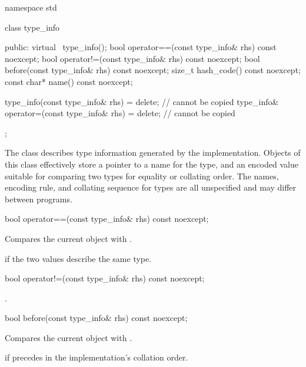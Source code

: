%
\begin{codeblock}
namespace std {
  class type_info {
  public:
    virtual ~type_info();
    bool operator==(const type_info& rhs) const noexcept;
    bool operator!=(const type_info& rhs) const noexcept;
    bool before(const type_info& rhs) const noexcept;
    size_t hash_code() const noexcept;
    const char* name() const noexcept;

    type_info(const type_info& rhs) = delete;            // cannot be copied
    type_info& operator=(const type_info& rhs) = delete; // cannot be copied
  };
}
\end{codeblock}

\pnum
The class
describes type information generated by the implementation.
Objects of this class effectively store a pointer to a name for the type, and
an encoded value suitable for comparing two types for equality or collating order.
The names, encoding rule, and collating sequence for types are all unspecified
%
and may differ between programs.

%
\begin{itemdecl}
bool operator==(const type_info& rhs) const noexcept;
\end{itemdecl}

\begin{itemdescr}
\pnum
\effects
Compares the current object with .

\pnum
\returns
{}
if the two values describe the same type.
\end{itemdescr}

%
\begin{itemdecl}
bool operator!=(const type_info& rhs) const noexcept;
\end{itemdecl}

\begin{itemdescr}
\pnum
\returns
{}.
\end{itemdescr}

%
\begin{itemdecl}
bool before(const type_info& rhs) const noexcept;
\end{itemdecl}

\begin{itemdescr}
\pnum
\effects
Compares the current object with .

\pnum
\returns
{}
if
precedes  in the implementation's collation order.
\end{itemdescr}


